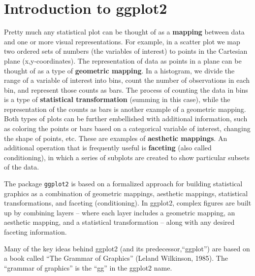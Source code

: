 \documentclass[]{book}
\newenvironment{Shaded}{\begin{snugshade}}{\end{snugshade}}
\newcommand{\CommentTok}[1]{\textcolor[rgb]{0.56,0.35,0.01}{\textit{#1}}}
\newcommand{\DecValTok}[1]{\textcolor[rgb]{0.00,0.00,0.81}{#1}}
\newcommand{\KeywordTok}[1]{\textcolor[rgb]{0.13,0.29,0.53}{\textbf{#1}}}
\newcommand{\NormalTok}[1]{#1}
\newcommand{\OperatorTok}[1]{\textcolor[rgb]{0.81,0.36,0.00}{\textbf{#1}}}
\newcommand{\StringTok}[1]{\textcolor[rgb]{0.31,0.60,0.02}{#1}}
\theoremstyle{definition}
\theoremstyle{definition}
\theoremstyle{definition}
\theoremstyle{remark}
\begin{document}
\begin{Shaded}
\end{Shaded}

\hypertarget{introduction-to-ggplot2}{%
\chapter{Introduction to ggplot2}\label{introduction-to-ggplot2}}

Pretty much any statistical plot can be thought of as a \textbf{mapping}
between data and one or more visual representations. For example, in a
scatter plot we map two ordered sets of numbers (the variables of
interest) to points in the Cartesian plane (x,y-coordinates). The
representation of data as points in a plane can be thought of as a type
of \textbf{geometric mapping}. In a histogram, we divide the range of a
variable of interest into bins, count the number of observations in each
bin, and represent those counts as bars. The process of counting the
data in bins is a type of \textbf{statistical transformation} (summing
in this case), while the representation of the counts as bars is another
example of a geometric mapping. Both types of plots can be further
embellished with additional information, such as coloring the points or
bars based on a categorical variable of interest, changing the shape of
points, etc. These are examples of \textbf{aesthetic mappings}. An
additional operation that is frequently useful is \textbf{faceting}
(also called conditioning), in which a series of subplots are created to
show particular subsets of the data.

The package \texttt{ggplot2} is based on a formalized approach for
building statistical graphics as a combination of geometric mappings,
aesthetic mappings, statistical transformations, and faceting
(conditioning). In ggplot2, complex figures are built up by combining
layers -- where each layer includes a geometric mapping, an aesthetic
mapping, and a statistical transformation -- along with any desired
faceting information.

Many of the key ideas behind ggplot2 (and its predecessor,``ggplot'')
are based on a book called ``The Grammar of Graphics'' (Leland
Wilkinson, 1985). The ``grammar of graphics'' is the ``gg'' in the
ggplot2 name.
\end{document}
